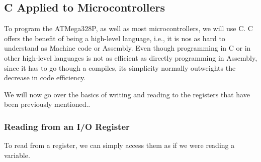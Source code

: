 \begin{table}[htbp]
\end{table}

\clearpage

\subsection{C Applied to Microcontrollers}

To program the ATMega328P, as well as most microcontrollers, we will use C. C offers the benefit of being a high-level language, i.e., it is nos as hard to understand as Machine code or Assembly. Even though programming in C or in other high-level languages is not as efficient as directly programming in Assembly, since it has to go though a compiles, its simplicity normally outweights the decrease in code efficiency. \medskip

We will now go over the basics of writing and reading to the registers that have been previously mentioned..

\subsubsection{Reading from an I/O Register}

To read from a register, we can simply access them as if we were reading a variable.


